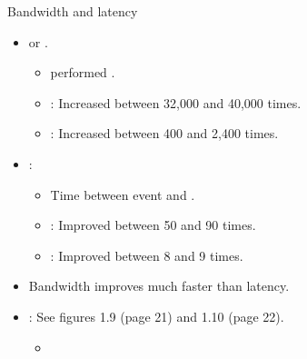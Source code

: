 \begin{frame}[t]{Bandwidth and latency}
  \begin{itemize}
    \item {} or .
      \begin{itemize}
        \item {} performed .
        \item {}: Increased between 32,000 and 40,000 times.
        \item {}: Increased between 400 and 2,400 times.
      \end{itemize}

    \item {}:
      \begin{itemize}
        \item Time between event  and .
        \item {}: Improved between 50 and 90 times.
        \item {}: Improved between 8 and 9 times.
      \end{itemize}

    \item Bandwidth improves much faster than latency.

    \item {}: See figures 1.9 (page 21) and 1.10 (page 22).
      \begin{itemize}
        \item \bibhennessy
      \end{itemize}
  \end{itemize}
\end{frame}
